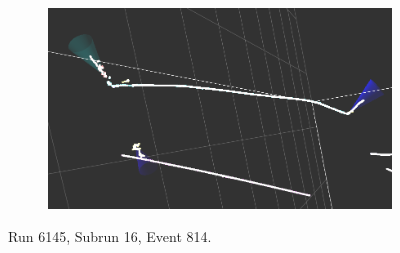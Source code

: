 \begin{figure}[htbp]
\begin{center}
\begin{subfigure}{0.45\textwidth}
\includegraphics[width=0.95\linewidth]{figs/datapi0/evd/Run6145Subrun16Evt814.png}
\caption{}
\end{subfigure}
\begin{subfigure}{0.45\textwidth}
\caption{}
\end{subfigure}
\caption{Run 6145, Subrun 16, Event 814.}
\label{fig:evd6145_16_814}
\end{center}
\end{figure}

